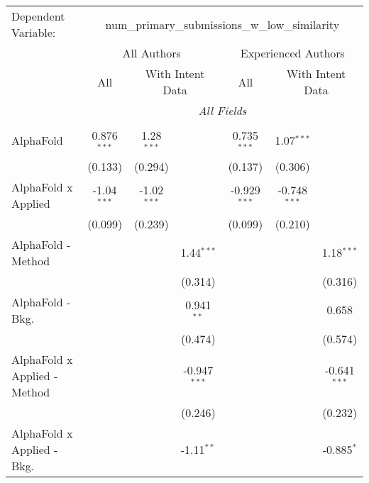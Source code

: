 \begingroup
\centering
\begin{tabular}{lcccccc}
   \tabularnewline \midrule \midrule
   Dependent Variable: & \multicolumn{6}{c}{num\_primary\_submissions\_w\_low\_similarity}\\
 & \multicolumn{3}{c}{All Authors} & \multicolumn{3}{c}{Experienced Authors} \\
\cmidrule(lr){2-4} \cmidrule(lr){5-7}
 & \multicolumn{1}{c}{All} & \multicolumn{2}{c}{With Intent Data} & \multicolumn{1}{c}{All} & \multicolumn{2}{c}{With Intent Data} \\
\cmidrule(lr){2-2} \cmidrule(lr){3-4} \cmidrule(lr){5-5} \cmidrule(lr){6-7}
 & \multicolumn{6}{c}{\textit{All Fields}} \\ \\
   AlphaFold                      & 0.876$^{***}$ & 1.28$^{***}$  &                & 0.735$^{***}$  & 1.07$^{***}$   &   \\   
                                  & (0.133)       & (0.294)       &                & (0.137)        & (0.306)        &   \\   
   AlphaFold x Applied            & -1.04$^{***}$ & -1.02$^{***}$ &                & -0.929$^{***}$ & -0.748$^{***}$ &   \\   
                                  & (0.099)       & (0.239)       &                & (0.099)        & (0.210)        &   \\   
   AlphaFold - Method             &               &               & 1.44$^{***}$   &                &                & 1.18$^{***}$\\   
                                  &               &               & (0.314)        &                &                & (0.316)\\   
   AlphaFold - Bkg.               &               &               & 0.941$^{**}$   &                &                & 0.658\\   
                                  &               &               & (0.474)        &                &                & (0.574)\\   
   AlphaFold x Applied - Method   &               &               & -0.947$^{***}$ &                &                & -0.641$^{***}$\\   
                                  &               &               & (0.246)        &                &                & (0.232)\\   
   AlphaFold x Applied - Bkg.     &               &               & -1.11$^{**}$   &                &                & -0.885$^{*}$\\   

\end{tabular}
